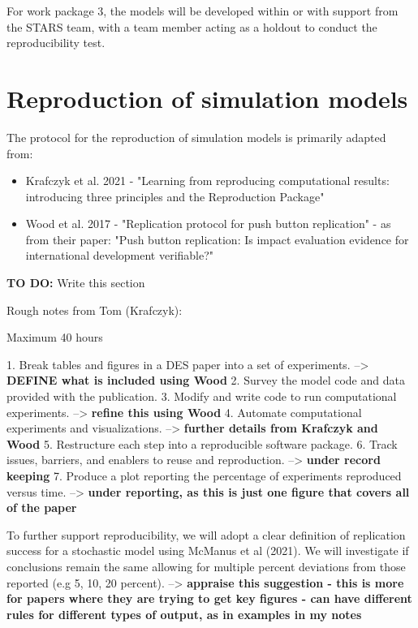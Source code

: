 For work package 3, the models will be developed within or with support from the STARS team, with a team member acting as a holdout to conduct the reproducibility test.

\section{Reproduction of simulation models}

The protocol for the reproduction of simulation models is primarily adapted from:
\begin{itemize}
    \item Krafczyk et al. 2021 - "Learning from reproducing computational results: introducing three principles and the Reproduction Package"\autocite{krafczyk_learning_2021}
    \item Wood et al. 2017 - "Replication protocol for push button replication"\autocite{wood_replication_2018} - as from their paper: "Push button replication: Is impact evaluation evidence for international development verifiable?"\autocite{wood_push_2018}
\end{itemize}

\textbf{TO DO:} Write this section

Rough notes from Tom (Krafczyk):

Maximum 40 hours

1. Break tables and figures in a DES paper into a set of experiments. --> \textbf{DEFINE what is included using Wood}
2. Survey the model code and data provided with the publication. 
3. Modify and write code to run computational experiments. --> \textbf{refine this using Wood}
4. Automate computational experiments and visualizations. --> \textbf{further details from Krafczyk and Wood}
5. Restructure each step into a reproducible software package.
6. Track issues, barriers, and enablers to reuse and reproduction. --> \textbf{under record keeping}
7. Produce a plot reporting the percentage of experiments reproduced versus time. --> \textbf{under reporting, as this is just one figure that covers all of the paper}

To further support reproducibility, we will adopt a clear definition of replication success for a stochastic model using McManus et al (2021). We will investigate if conclusions remain the same allowing for multiple percent deviations from those reported (e.g 5, 10, 20 percent). --> \textbf{appraise this suggestion - this is more for papers where they are trying to get key figures - can have different rules for different types of output, as in examples in my notes}

